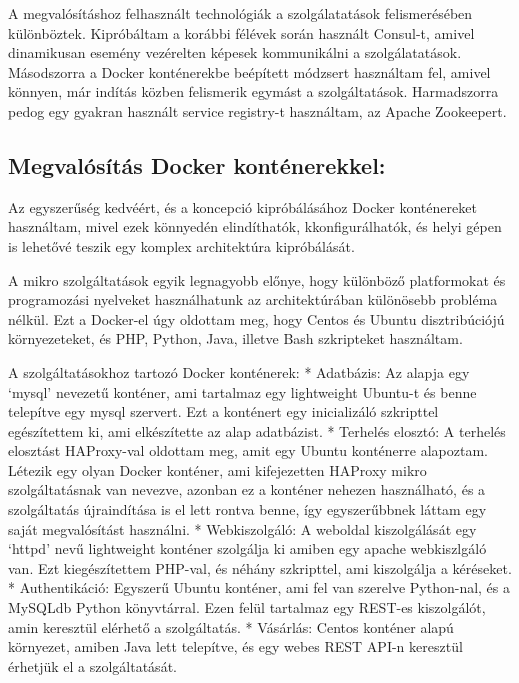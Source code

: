 \documentclass[]{article}
\begin{document}
A megvalósításhoz felhasznált technológiák a szolgálatatások
felismerésében különböztek. Kipróbáltam a korábbi félévek során használt
Consul-t, amivel dinamikusan esemény vezérelten képesek kommunikálni a
szolgálatatások. Másodszorra a Docker konténerekbe beépített módzsert
használtam fel, amivel könnyen, már indítás közben felismerik egymást a
szolgáltatások. Harmadszorra pedog egy gyakran használt service
registry-t használtam, az Apache Zookeepert.

\subsection{Megvalósítás Docker
konténerekkel:}\label{megvaluxf3suxedtuxe1s-docker-kontuxe9nerekkel}

Az egyszerűség kedvéért, és a koncepció kipróbálásához Docker
konténereket használtam, mivel ezek könnyedén elindíthatók,
kkonfigurálhatók, és helyi gépen is lehetővé teszik egy komplex
architektúra kipróbálását.

A mikro szolgáltatások egyik legnagyobb előnye, hogy különböző
platformokat és programozási nyelveket használhatunk az architektúrában
különösebb probléma nélkül. Ezt a Docker-el úgy oldottam meg, hogy
Centos és Ubuntu disztribúciójú környezeteket, és PHP, Python, Java,
illetve Bash szkripteket használtam.

A szolgáltatásokhoz tartozó Docker konténerek: * Adatbázis: Az alapja
egy `mysql' nevezetű konténer, ami tartalmaz egy lightweight Ubuntu-t és
benne telepítve egy mysql szervert. Ezt a konténert egy inicializáló
szkripttel egészítettem ki, ami elkészítette az alap adatbázist. *
Terhelés elosztó: A terhelés elosztást HAProxy-val oldottam meg, amit
egy Ubuntu konténerre alapoztam. Létezik egy olyan Docker konténer, ami
kifejezetten HAProxy mikro szolgáltatásnak van nevezve, azonban ez a
konténer nehezen használható, és a szolgáltatás újraindítása is el lett
rontva benne, így egyszerűbbnek láttam egy saját megvalósítást
használni. * Webkiszolgáló: A weboldal kiszolgálását egy `httpd' nevű
lightweight konténer szolgálja ki amiben egy apache webkiszlgáló van.
Ezt kiegészítettem PHP-val, és néhány szkripttel, ami kiszolgálja a
kéréseket. * Authentikáció: Egyszerű Ubuntu konténer, ami fel van
szerelve Python-nal, és a MySQLdb Python könyvtárral. Ezen felül
tartalmaz egy REST-es kiszolgálót, amin keresztül elérhető a
szolgáltatás. * Vásárlás: Centos konténer alapú környezet, amiben Java
lett telepítve, és egy webes REST API-n keresztül érhetjük el a
szolgáltatását.
\end{document}

